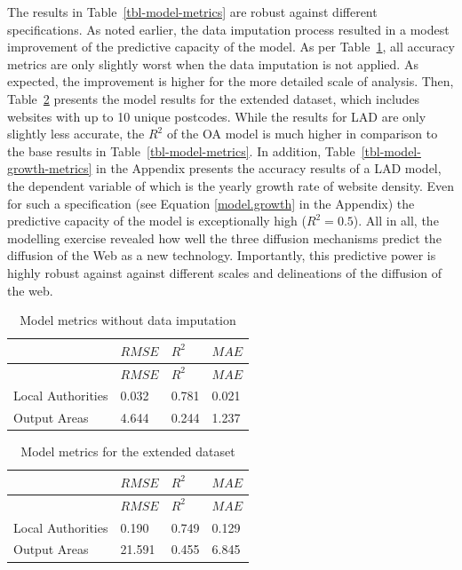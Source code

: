 \documentclass[
  authoryear,
  preprint,
  3p]{elsarticle}
\begin{document}
The results in Table~\ref{tbl-model-metrics} are robust against
different specifications. As noted earlier, the data imputation process
resulted in a modest improvement of the predictive capacity of the
model. As per Table~\ref{tbl-model-metrics-no-correction}, all accuracy
metrics are only slightly worst when the data imputation is not applied.
As expected, the improvement is higher for the more detailed scale of
analysis. Then, Table~\ref{tbl-model-metrics-10} presents the model
results for the extended dataset, which includes websites with up to 10
unique postcodes. While the results for LAD are only slightly less
accurate, the \(R^{2}\) of the OA model is much higher in comparison to
the base results in Table~\ref{tbl-model-metrics}. In addition,
Table~\ref{tbl-model-growth-metrics} in the Appendix presents the
accuracy results of a LAD model, the dependent variable of which is the
yearly growth rate of website density. Even for such a specification
(see Equation \ref{model.growth} in the Appendix) the predictive
capacity of the model is exceptionally high (\(R^2 = 0.5\)). All in all,
the modelling exercise revealed how well the three diffusion mechanisms
predict the diffusion of the Web as a new technology. Importantly, this
predictive power is highly robust against against different scales and
delineations of the diffusion of the web.

\begin{longtable}[]{@{}llll@{}}
\caption{Model metrics without data
imputation}\label{tbl-model-metrics-no-correction}\tabularnewline
\toprule\noalign{}
& \(RMSE\) & \(R^{2}\) & \(MAE\) \\
\midrule\noalign{}
\endfirsthead
\toprule\noalign{}
& \(RMSE\) & \(R^{2}\) & \(MAE\) \\
\midrule\noalign{}
\endhead
\bottomrule\noalign{}
\endlastfoot
Local Authorities & 0.032 & 0.781 & 0.021 \\
Output Areas & 4.644 & 0.244 & 1.237 \\
\end{longtable}

\begin{longtable}[]{@{}llll@{}}
\caption{Model metrics for the extended
dataset}\label{tbl-model-metrics-10}\tabularnewline
\toprule\noalign{}
& \(RMSE\) & \(R^{2}\) & \(MAE\) \\
\midrule\noalign{}
\endfirsthead
\toprule\noalign{}
& \(RMSE\) & \(R^{2}\) & \(MAE\) \\
\midrule\noalign{}
\endhead
\bottomrule\noalign{}
\endlastfoot
Local Authorities & 0.190 & 0.749 & 0.129 \\
Output Areas & 21.591 & 0.455 & 6.845 \\
\end{longtable}
\end{document}
